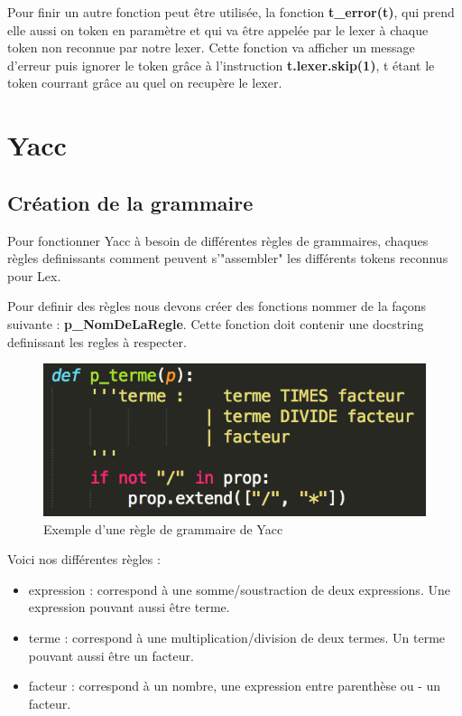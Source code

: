 \documentclass[a4paper,12pt]{article}
\begin{document}
		Pour finir un autre fonction peut être utilisée, la fonction \textbf{t\_error(t)}, qui prend elle aussi on token en paramètre et qui va être appelée par le lexer à chaque token non reconnue par notre lexer. Cette fonction va afficher un message d'erreur puis ignorer le token grâce à l'instruction \textbf{t.lexer.skip(1)}, t étant le token courrant grâce au quel on recupère le lexer. 

\section{Yacc}

	\subsection{Création de la grammaire}

		Pour fonctionner Yacc à besoin de différentes règles de grammaires, chaques règles definissants comment peuvent s'"assembler" les différents tokens reconnus pour Lex.

		Pour definir des règles nous devons créer des fonctions nommer de la façons suivante : \textbf{p\_NomDeLaRegle}. Cette fonction doit contenir une docstring definissant les regles à respecter.

		\begin{figure}[h!]
			\begin{center}
				\includegraphics[scale=1]{imgs/exp_grammaire_yacc}
				\caption{Exemple d'une règle de grammaire de Yacc}
			\end{center}
		\end{figure}

		Voici nos différentes règles : 
		\begin{itemize}
			\item expression : correspond à une somme/soustraction de deux expressions. Une expression pouvant aussi être terme.
			\item terme : correspond à une multiplication/division de deux termes. Un terme pouvant aussi être un facteur.
			\item facteur : correspond à un nombre, une expression entre parenthèse ou - un facteur.
		\end{itemize}
\end{document}
